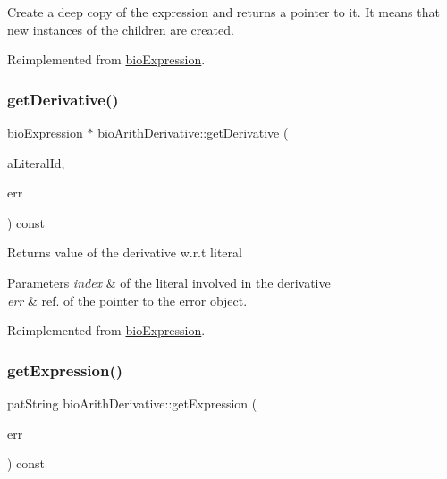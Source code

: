 Create a deep copy of the expression and returns a pointer to it. It means that new instances of the children are created. 

Reimplemented from \hyperlink{classbio_expression_a4ee1b8add634078a02eaae26cd40dcc8}{bio\+Expression}.

\mbox{\label{classbio_arith_derivative_a6a985cd2c3865e04a3ed54c11a88da17}} 
\subsubsection{\texorpdfstring{get\+Derivative()}{getDerivative()}}
{\footnotesize\ttfamily \hyperlink{classbio_expression}{bio\+Expression} $\ast$ bio\+Arith\+Derivative\+::get\+Derivative (\begin{DoxyParamCaption}\item[{pat\+U\+Long}]{a\+Literal\+Id,  }\item[{pat\+Error $\ast$\&}]{err }\end{DoxyParamCaption}) const\hspace{0.3cm}{\ttfamily [virtual]}}

\begin{DoxyReturn}{Returns}
value of the derivative w.\+r.\+t literal 
\end{DoxyReturn}

\begin{DoxyParams}{Parameters}
{\em index} & of the literal involved in the derivative \\
\hline
{\em err} & ref. of the pointer to the error object. \\
\hline
\end{DoxyParams}


Reimplemented from \hyperlink{classbio_expression_a5915579d1193f25f216c1e273c97f2ce}{bio\+Expression}.

\mbox{\label{classbio_arith_derivative_a5cdf6c4903ec8123b30c0d2ce059718d}} 
\subsubsection{\texorpdfstring{get\+Expression()}{getExpression()}}
{\footnotesize\ttfamily pat\+String bio\+Arith\+Derivative\+::get\+Expression (\begin{DoxyParamCaption}\item[{pat\+Error $\ast$\&}]{err }\end{DoxyParamCaption}) const\hspace{0.3cm}{\ttfamily [virtual]}}

